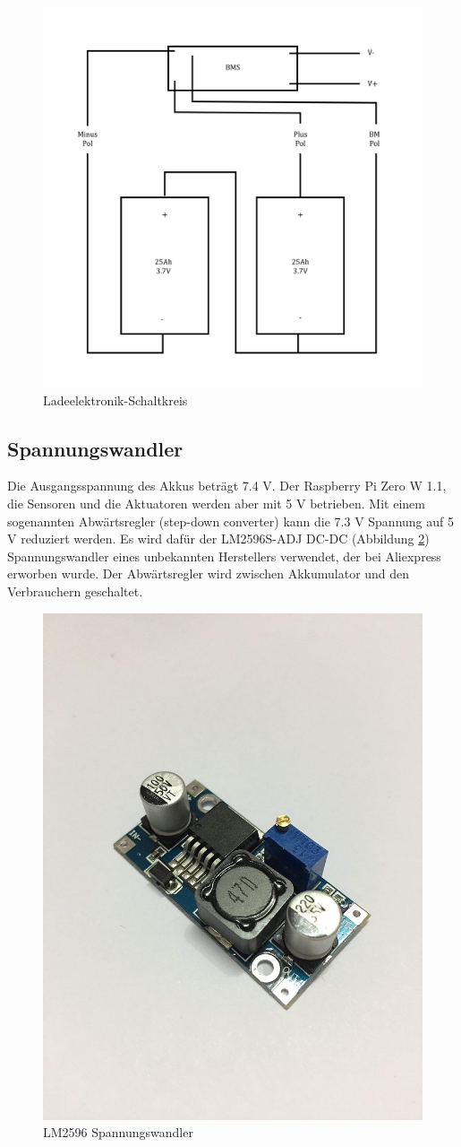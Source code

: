 \begin{figure}[H]
    \centering
    \includegraphics[width=0.5\linewidth]{assets/bms_graphic.png}
    \caption{Ladeelektronik-Schaltkreis}
    \label{fig:enter-label}
\end{figure}
\subsection{Spannungswandler}
Die Ausgangsspannung des Akkus beträgt 7.4 V. Der Raspberry Pi Zero W 1.1, die Sensoren und die  Aktuatoren werden aber mit 5 V betrieben. Mit einem sogenannten Abwärtsregler (step-down converter) kann die 7.3 V Spannung auf 5 V reduziert werden. Es wird dafür der LM2596S-ADJ DC-DC (Abbildung \ref{fig:lm25}) Spannungswandler eines unbekannten Herstellers verwendet, der bei Aliexpress erworben wurde. Der Abwärtsregler wird zwischen Akkumulator und den Verbrauchern geschaltet.

\begin{figure}
    \centering
    \includegraphics[width=0.5\linewidth]{assets/Spannungsregeler.png}
    \caption{LM2596 Spannungswandler}
    \label{fig:lm25}
\end{figure}


